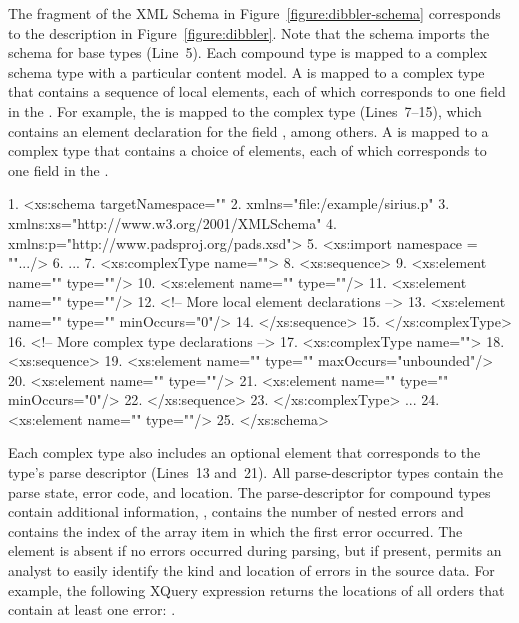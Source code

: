 The fragment of the XML Schema in Figure~\ref{figure:dibbler-schema}
corresponds to the description in Figure~\ref{figure:dibbler}.  Note
that the schema imports the schema for \pads{} base types (Line~5).
Each compound type is mapped to a complex schema type with a
particular content model.  A  is mapped to a complex type
that contains a sequence of local elements, each of which corresponds
to one field in the .  For example, the 
 is mapped to the complex type
 (Lines~7--15), which contains an element
declaration for the field , among others.  A
 is mapped to a complex type that contains a choice of
elements, each of which corresponds to one field in the .
\begin{figure*}
\begin{small}
\begin{code}
{ 1}. <xs:schema targetNamespace=""
{ 2}.            xmlns="file:/example/sirius.p"
{ 3}.            xmlns:xs="http://www.w3.org/2001/XMLSchema"
{ 4}.            xmlns:p="http://www.padsproj.org/pads.xsd">
{ 5}. <xs:import namespace = "".../>
{ 6}. ...
{ 7}. <xs:complexType name="">
{ 8}.  <xs:sequence>
{ 9}.   <xs:element name=""     type=""/>
{10}.   <xs:element name="" type=""/>
{11}.   <xs:element name=""   type=""/>
{12}.   <!-- More local element declarations -->
{13}.   <xs:element name=""            type="" minOccurs="0"/>
{14}.  </xs:sequence>
{15}. </xs:complexType>
{16}. <!-- More complex type declarations -->
{17}. <xs:complexType name="">
{18}.  <xs:sequence>
{19}.   <xs:element name=""    type="" maxOccurs="unbounded"/>
{20}.   <xs:element name="" type=""/>
{21}.   <xs:element name=""     type="" minOccurs="0"/>
{22}.  </xs:sequence>
{23}. </xs:complexType>
     ...
{24}. <xs:element name="" type=""/>
{25}. </xs:schema>
\end{code}
\end{small}
\caption{Fragment of XML Schema for \dibbler{} \pads{} description.}
\label{figure:dibbler-schema}
\end{figure*}

Each complex type also includes an optional  element that
corresponds to the type's parse descriptor (Lines~13 and~21).  All
parse-descriptor types contain the parse state, error code, and
location.  The parse-descriptor for compound types contain additional
information, \eg{},  contains the number of nested
errors and  contains the index of the array item in
which the first error occurred.  The  element is absent if no
errors occurred during parsing, but if present, permits an analyst to
easily identify the kind and location of errors in the source data.
For example, the following XQuery expression returns the locations of all
orders that contain at least one error:
.


